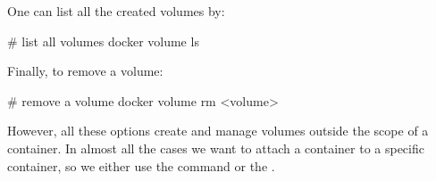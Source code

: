 One can list all the created volumes by:

\begin{bash}
# list all volumes
docker volume ls
\end{bash}

Finally, to remove a volume:

\begin{bash}
# remove a volume
docker volume rm <volume>
\end{bash}

However, all these options create and manage volumes outside the scope of a container. In almost all the cases we
want to attach a container to a specific container, so we either use the  command or the
.